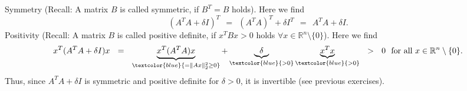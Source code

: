 {
\color{solution}
Symmetry (Recall: A matrix $B$ is called symmetric, if $B^T=B$ holds). Here we find\\
	$$(A^TA +\delta I)^T \ \ =\ \ (A^TA)^T+\delta I^T\ \ =\ \ A^TA+\delta I.$$
Positivity (Recall: A matrix $B$ is called positive definite, if $x^TBx> 0$ holds $\forall x\in\mathbb{R}^n\setminus\{0\}$). Here we find\\
	$$x^T(A^TA+\delta I)x\ \ =\ \ \underbrace{x^T(A^TA)x}_{ \textcolor{blue}{=\|Ax\|_2^2\geq 0}}+\underbrace{\delta}_{\textcolor{blue}{>0}}\underbrace{x^Tx}_{\textcolor{blue}{>0}}\ \ >\ \ 0\ \ \text{for all}~ x\in\mathbb{R}^n\setminus\{0\}.$$
Thus, since $A^TA+\delta I$ is symmetric and positive definite for $\delta > 0$, it is invertible (see previous exercises).
}